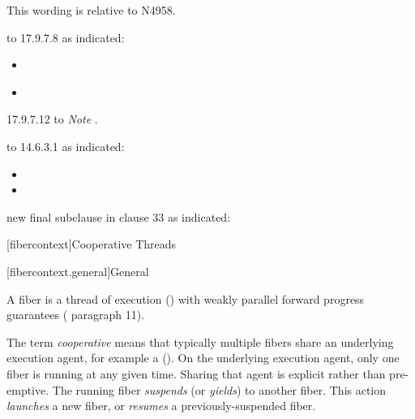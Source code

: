 \newpage
{}\label{api}

This wording is relative to N4958.\cite{Standard}

 to 17.9.7.8  as indicated:

\begin{itemize}
    \item {}\\
    \item {}\\
\end{itemize}
\add{\exitnote}

 17.9.7.12 to \emph{Note }.

 to 14.6.3.1  as indicated:

\begin{itemize}
    \item {}
    \item {}
\end{itemize}
\add{\exitnote}

 new final subclause in clause 33  as indicated:

\setcounter{section}{33}
\setcounter{subsection}{11}
\setcounter{secnumdepth}{5}

[fibercontext]{Cooperative Threads}

[fibercontext.general]{General}

\para A fiber is a thread of execution () with
weakly parallel forward progress guarantees ( paragraph 11).

\para The term \emph{cooperative} means that typically multiple fibers share
an underlying execution agent, for example a 
(). On the underlying execution agent, only one
fiber is running at any given time. Sharing that agent is explicit rather than
pre-emptive. The running fiber \emph{suspends} (or \emph{yields}) to another
fiber. This action \emph{launches} a new fiber, or \emph{resumes} a
previously-suspended fiber.

